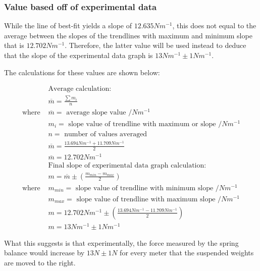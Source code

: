 \documentclass[letterpaper, 12pt]{article}
\begin{document}
\subsubsection{Value based off of experimental data}

While the line of best-fit yields a slope of $12.635\unit{Nm^{-1}}$,
this does not equal to the average between the slopes of the trendlines
with maximum and minimum slope that is $12.702\unit{Nm^{-1}}$. Therefore,
the latter value will be used instead to deduce that the slope of the
experimental data graph is $13\unit{Nm^{-1}} \pm 1\unit{Nm^{-1}}$.

The calculations for these values are shown below:

\begin{align*}
                  & \text{Average calculation:}
    \\
                  & \overline{m} = \frac{\sum m_i}{n}
    \\
    \text{where } & \overline{m} = \text{ average slope value } /\unit{Nm^{-1}}
    \\ & m_i = \text{ slope value of trendline with maximum or slope } /\unit{Nm^{-1}}
    \\ & n = \text{ number of values averaged }
    \\
                  & \overline{m} = \frac{13.694\unit{Nm^{-1}} + 11.709\unit{Nm^{-1}}}{2}
    \\
                  & \overline{m} = 12.702\unit{Nm^{-1}}
    \\
                  & \text{Final slope of experimental data graph calculation:}
    \\
                  & m = \overline{m} \pm \left(\frac{m_{min} - m_{max}}{2}\right)
    \\
    \text{where } & m_{min} = \text{ slope value of trendline with minimum slope } /\unit{Nm^{-1}}
    \\ & m_{max} = \text{ slope value of trendline with maximum slope } /\unit{Nm^{-1}}
    \\
                  & m = 12.702\unit{Nm^{-1}} \pm \left(\frac{13.694\unit{Nm^{-1}} - 11.709\unit{Nm^{-1}}}{2}\right)
    \\
                  & m = 13\unit{Nm^{-1}} \pm 1\unit{Nm^{-1}}
\end{align*}

What this suggests is that experimentally, the force measured by the
spring balance would increase by $13\unit{N} \pm 1\unit{N}$ for every
meter that the suspended weights are moved to the right.
\end{document}
